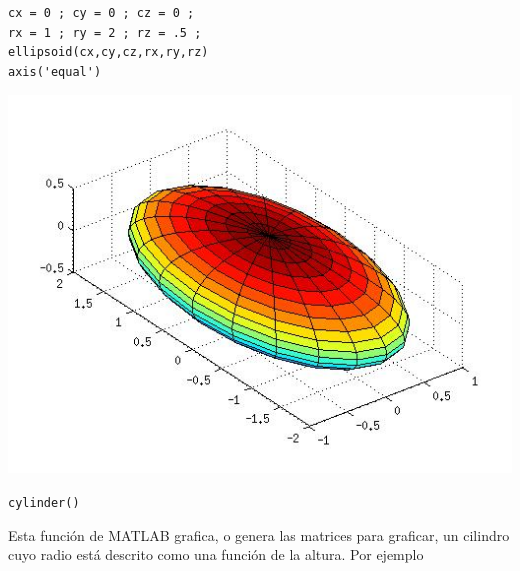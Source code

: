 \documentclass[11pt]{article}
\begin{document}
\begin{minipage}{0.4\textwidth}
\begin{verbatim}
cx = 0 ; cy = 0 ; cz = 0 ;
rx = 1 ; ry = 2 ; rz = .5 ;
ellipsoid(cx,cy,cz,rx,ry,rz)
axis('equal')
\end{verbatim} 
\end{minipage}
\begin{minipage}{0.5\textwidth}
 \begin{center}
      \includegraphics[width=\textwidth]{./elipsoide.jpg}
 \end{center}
\end{minipage}

\texttt{cylinder()}

Esta funci\'on de MATLAB grafica, o genera 
las matrices para graficar, un cilindro cuyo 
radio est\'a descrito como una funci\'on de la altura. Por ejemplo 
\end{document}
